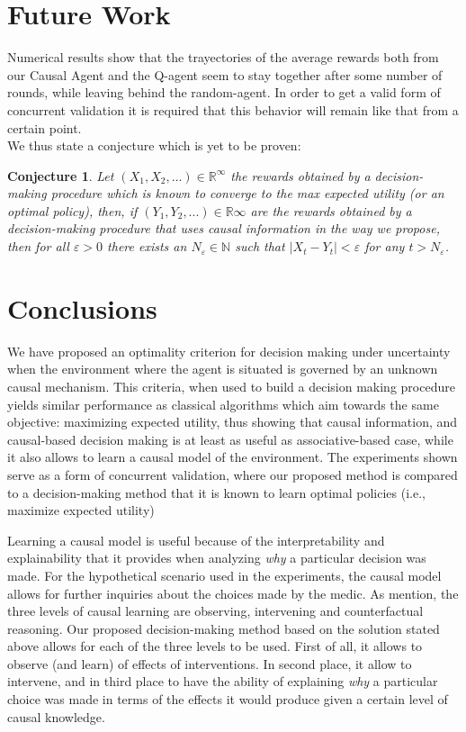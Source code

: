 \documentclass[letterpaper]{article}
\theoremstyle{plain}
\newtheorem{conj}{Conjecture}
\begin{document}
\section{Future Work}
Numerical results show that the trayectories of the average rewards both from our Causal Agent and the Q-agent seem to stay together after some number of rounds, while leaving behind the random-agent. In order to get a valid form of concurrent validation it is required that this behavior will remain like that from a certain point. \\
We thus state a conjecture which is yet to be proven:
\begin{conj}
Let $(X_1,X_2,...) \in \mathbb{R}^\infty$ the rewards obtained by a decision-making procedure which is known to converge to the max expected utility (or an optimal policy), then, if $(Y_1, Y_2,...) \in \mathbb{R}\infty$ are the rewards obtained by a decision-making procedure that uses causal information in the way we propose, then for all $\varepsilon > 0$ there exists an $N_\varepsilon \in \mathbb{N}$ such that $ | X_t - Y_t | < \varepsilon$ for any $t > N_\varepsilon$.
\end{conj}

\section{Conclusions}
We have proposed an optimality criterion for decision making under uncertainty when the environment where the agent is situated is governed by an unknown causal mechanism. This criteria, when used to build a decision making procedure yields similar performance as classical algorithms which aim towards the same objective: maximizing expected utility, thus showing that causal information, and causal-based decision making is at least as useful as associative-based case, while it also allows to learn a causal model of the environment. The experiments shown serve as a form of concurrent validation, where our proposed method is compared to a decision-making method that it is known to learn optimal policies (i.e., maximize expected utility)

Learning a causal model is useful because of the interpretability and explainability that it provides when analyzing \textit{why} a particular decision was made. For the hypothetical scenario used in the experiments, the causal model allows for further inquiries about the choices made by the medic. As \cite{pearl2018why} mention, the three levels of causal learning are observing, intervening and counterfactual reasoning. Our proposed decision-making method based on the solution stated above allows for each of the three levels to be used. First of all, it allows to observe (and learn) of effects of interventions. In second place, it allow to intervene, and in third place to have the ability of explaining \textit{why} a particular choice was made in terms of the effects it would produce given a certain level of causal knowledge.
\end{document}
